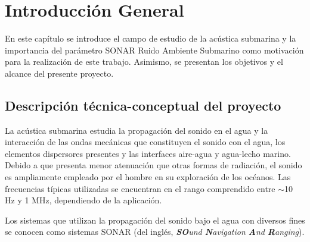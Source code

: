 
\chapter{Introducción General} %

\label{Chapter1} %
\label{IntroGeneral}


\newcommand{\keyword}[1]{\textbf{#1}}
\newcommand{\tabhead}[1]{\textbf{#1}}
\newcommand{\code}[1]{\texttt{#1}}
\newcommand{\file}[1]{\texttt{\bfseries#1}}
\newcommand{\option}[1]{\texttt{\itshape#1}}
\newcommand{\grados}{$^{\circ}$}


En este capítulo se introduce el campo de estudio de la acústica submarina y la importancia del parámetro SONAR Ruido Ambiente Submarino como motivación para la realización de este trabajo.  Asimismo, se presentan los objetivos y el alcance del presente proyecto.
\section{Descripción técnica-conceptual del proyecto}


La acústica submarina estudia la propagación del sonido en el agua y la interacción de las ondas mecánicas que constituyen el sonido con el agua, los elementos dispersores presentes y las interfaces aire-agua y agua-lecho marino.  Debido a que presenta menor atenuación que otras formas de radiación, el sonido es ampliamente empleado  por el hombre en su exploración de los océanos.  Las frecuencias típicas utilizadas se encuentran en el rango comprendido entre $\sim$10 Hz y 1 MHz, dependiendo de la aplicación.  

Los sistemas que utilizan la propagación del sonido bajo el agua con diversos fines se conocen como sistemas SONAR (del inglés, \textit{\textbf{SO}und \textbf{N}avigation \textbf{A}nd \textbf{R}anging}).

